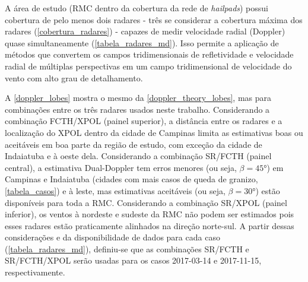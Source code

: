 A área de estudo (RMC dentro da cobertura da rede de \textit{hailpads}) possui cobertura de pelo menos dois radares - três se considerar a cobertura máxima dos radares (\autoref{cobertura_radares}) - capazes de medir velocidade radial (Doppler) quase simultaneamente (\autoref{tabela_radares_md}). Isso permite a aplicação de métodos que convertem os campos tridimensionais de refletividade e velocidade radial de múltiplas perspectivas em um campo tridimensional de velocidade do vento com alto grau de detalhamento.

\begin{table}[htb]
\end{table}

A \autoref{doppler_lobes} mostra o mesmo da \autoref{doppler_theory_lobes}, mas para combinações entre os três radares usados neste trabalho. Considerando a combinação FCTH/XPOL (painel superior), a distância entre os radares e a localização do XPOL dentro da cidade de Campinas limita as estimativas boas ou aceitáveis em boa parte da região de estudo, com exceção da cidade de Indaiatuba e à oeste dela. Considerando a combinação SR/FCTH (painel central), a estimativa Dual-Doppler tem erros menores (ou seja, $\beta=\ang{45}$) em Campinas e Indaiatuba (cidades com mais casos de queda de granizo, \autoref{tabela_casos}) e à leste, mas estimativas aceitáveis (ou seja, $\beta=\ang{30}$) estão disponíveis para toda a RMC. Considerando a combinação SR/XPOL (painel inferior), os ventos à nordeste e sudeste da RMC não podem ser estimados pois esses radares estão praticamente alinhados na direção norte-sul. A partir dessas considerações e da disponibilidade de dados para cada caso (\autoref{tabela_radares_md}), definiu-se que as combinações SR/FCTH e SR/FCTH/XPOL serão usadas para os casos 2017-03-14 e 2017-11-15, respectivamente.


